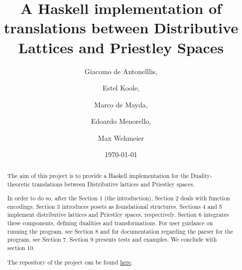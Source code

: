 \documentclass[12pt,a4paper]{article}
\title{A Haskell implementation of translations between Distributive Lattices and Priestley Spaces}
\author{Giacomo de Antonelllis, \and Estel Koole, \and Marco de Mayda, \and  Edoardo Menorello, \and  Max Wehmeier}
\date{\today}
\begin{document}
\maketitle

\begin{abstract}

The aim of this project is to provide a Haskell implementation for the Duality-theoretic translations between Distributive lattices and Priestley spaces.

In order to do so, after the Section 1 (the introduction), Section 2 deals with function encodings. Section 3 introduces posets as foundational structures. Sections 4 and 5 implement distributive lattices and Priestley spaces, respectively. Section 6 integrates these components, defining dualities and transformations.
For user guidance on running the program, see Section 8 and for documentation regarding the parser for the program, see Section 7.  Section 9 presents tests and examples. We conclude with section 10.

The repository of the project can be found \href{https://github.com/maxwehmi/functional-duality}{here}.
\end{abstract}

\clearpage
\setcounter{tocdepth}{2} 
\tableofcontents

\clearpage




























\end{document}
